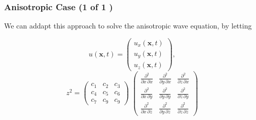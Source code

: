 \documentclass{beamer}
\newcommand{\threemat}[9]{ \left( \begin{array}{ccc} #1 & #2 & #3 \\ #4 & #5 & #6 \\ #7 & #8 & #9 \end{array} \right) }
\newcommand{\threevec}[3] { \left( \begin{array}{c} #1  \\ #2 \\ #3  \end{array} \right) }
\begin{document}
\begin{frame}
\frametitle{Anisotropic Case (1 of 1	)}
\begin{flushleft}
We can addapt this approach to solve the anisotropic wave equation, by letting
\end{flushleft}
\begin{equation*}
	u (\mathbf{x},t) = \threevec{ u_x(\mathbf{x},t) }{ u_y(\mathbf{x},t) }{ u_z(\mathbf{x},t) },
\end{equation*}
\begin{equation*}
	z^2 = \threemat{c_1}{c_2}{c_3} {c_4}{c_5}{c_6} {c_7}{c_9}{c_9} \; \threemat {\frac{\partial^2}{\partial x \, \partial x}}{\frac{\partial^2}{\partial y \, \partial x}}{ \frac{\partial^2}{\partial z \, \partial x}} 
	{\frac{\partial^2}{\partial x \, \partial y}}{\frac{\partial^2}{\partial y \, \partial y}}{\frac{\partial^2}{\partial z \, \partial y}}
	 {\frac{\partial^2}{\partial x \, \partial z}}{\frac{\partial^2}{\partial y \, \partial z}}{\frac{\partial^2}{\partial z \, \partial z	}}
\end{equation*}
\end{frame}
\end{document}
